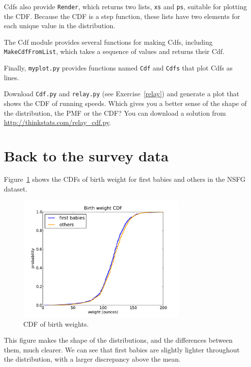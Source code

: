 \documentclass[12pt]{book}
\begin{document}
Cdfs also provide {\tt Render}, which returns two lists, {\tt xs} and
{\tt ps}, suitable for plotting the CDF.  Because the CDF is a
step function, these lists have two elements for each unique
value in the distribution.

The Cdf module provides several functions for making Cdfs, including
{\tt MakeCdfFromList}, which takes a sequence of values
and returns their Cdf.

Finally, {\tt myplot.py} provides functions named {\tt Cdf} and
{\tt Cdfs} that plot Cdfs as lines.

\begin{exercise}
Download {\tt Cdf.py} and \verb"relay.py" (see
Exercise~\ref{relay}) and generate a plot that shows the CDF of
running speeds.  Which gives you a better sense of the shape of the
distribution, the PMF or the CDF?  You can download a solution
from \url{http://thinkstats.com/relay_cdf.py}.

\end{exercise}


\section{Back to the survey data}
\label{birth_weights}

Figure~\ref{nsfg_birthwgt_cdf} shows the CDFs of birth weight for
first babies and others in the NSFG dataset.

\begin{figure}
\centerline{\includegraphics[height=2.5in]{figs/nsfg_birthwgt_cdf.pdf}}
\caption{CDF of birth weights.}
\label{nsfg_birthwgt_cdf}
\end{figure}

This figure makes the shape of the distributions, and the differences
between them, much clearer.  We can see that first babies are slightly
lighter throughout the distribution, with a larger discrepancy above 
the mean.
\end{document}
